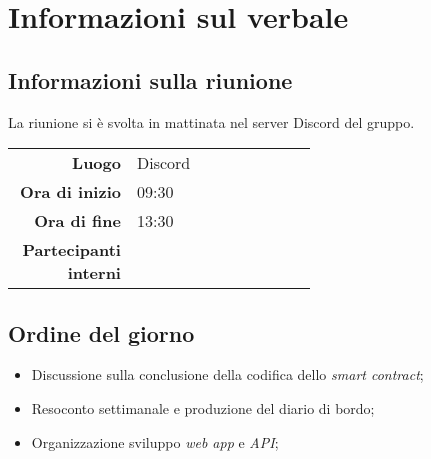 \section{Informazioni sul verbale}

\subsection{Informazioni sulla riunione}
La riunione si è svolta in mattinata nel server Discord del gruppo.

\begin{center}
	\begin{tabular}{r|p{0.6\linewidth}}
		\toprule
		\textbf{Luogo} & Discord \\
		\textbf{Ora di inizio} & 09:30 \\
		\textbf{Ora di fine} & 13:30 \\
		\textbf{Partecipanti interni} & \groupTeam
	\end{tabular}
\end{center}

\medskip

\subsection{Ordine del giorno}
\begin{itemize}
	\item Discussione sulla conclusione della codifica dello \textit{smart contract};
	\item Resoconto settimanale e produzione del diario di bordo;
	\item Organizzazione sviluppo \textit{web app} e \textit{API};
\end{itemize}